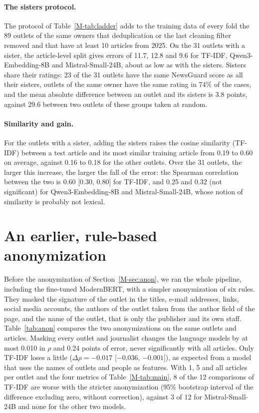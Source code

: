 \documentclass[11pt,a4paper]{article}
\begin{document}
\paragraph{The sisters protocol.} The protocol of Table~\ref{M-tab:ladder} adds to the training data of every fold the
89 outlets of the same owners that deduplication or the last cleaning filter removed and that have at least 10 articles
from 2025. On the 31 outlets with a sister, the article-level split gives errors of 11.7, 12.8 and 9.6 for TF-IDF,
Qwen3-Embedding-8B and Mistral-Small-24B, about as low as with the sisters. Sisters share their ratings: 23 of the 31
outlets have the same NewsGuard score as all their sisters, outlets of the same owner have the same rating in 74\% of
the cases, and the mean absolute difference between an outlet and its sisters is 3.8 points, against 29.6 between two
outlets of these groups taken at random.

\paragraph{Similarity and gain.} For the outlets with a sister, adding the sisters raises the cosine similarity (TF-IDF)
between a test article and its most similar training article from 0.19 to 0.60 on average, against 0.16 to 0.18 for
the other outlets. Over the 31 outlets, the larger this increase, the larger the fall of the error: the Spearman
correlation between the two is 0.60 [0.30, 0.80] for TF-IDF, and 0.25 and 0.32 (not significant) for
Qwen3-Embedding-8B and Mistral-Small-24B, whose notion of similarity is probably not lexical.

\section{An earlier, rule-based anonymization}\label{app:anon}
Before the anonymization of Section~\ref{M-sec:anon}, we ran the whole pipeline, including the fine-tuned ModernBERT,
with a simpler anonymization of six rules. They masked the signature of the outlet in the titles, e-mail addresses,
links, social media accounts, the authors of the outlet taken from the author field of the page, and the name of the
outlet, that is only the publisher and its own staff. Table~\ref{tab:anon} compares the two anonymizations on the same
outlets and articles. Masking every outlet and journalist changes the language models by at most 0.010 in $\rho$ and
0.24 points of error, never significantly with all articles. Only TF-IDF loses a little ($\Delta\rho = -0.017$
[$-0.036$, $-0.001$]), as expected from a model that uses the names of outlets and people as features. With 1, 5 and
all articles per outlet and the four metrics of Table~\ref{M-tab:main}, 8 of the 12 comparisons of TF-IDF are worse
with the stricter anonymization (95\% bootstrap interval of the difference excluding zero, without correction), against
3 of 12 for Mistral-Small-24B and none for the other two models.
\end{document}
